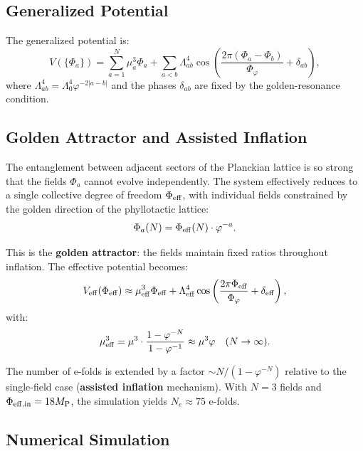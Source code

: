 \documentclass[11pt,a4paper]{article}
\theoremstyle{definition}
\begin{document}
\subsection{Generalized Potential}

The generalized potential is:
\begin{equation}
V(\{\Phi_a\}) = \sum_{a=1}^N \mu_a^3 \Phi_a + \sum_{a < b} \Lambda_{ab}^4 \cos\left( \frac{2\pi(\Phi_a - \Phi_b)}{\Phi_\varphi} + \delta_{ab} \right),
\end{equation}
where $\Lambda_{ab}^4 = \Lambda_0^4 \varphi^{-2|a-b|}$ and the phases $\delta_{ab}$ are fixed by the golden-resonance condition.

\subsection{Golden Attractor and Assisted Inflation}

The entanglement between adjacent sectors of the Planckian lattice is so strong that the fields $\Phi_a$ cannot evolve independently. The system effectively reduces to a single collective degree of freedom $\Phi_{\rm eff}$, with individual fields constrained by the golden direction of the phyllotactic lattice:
\begin{equation}\label{eq:attractor}
\Phi_a(N) = \Phi_{\rm eff}(N) \cdot \varphi^{-a}.
\end{equation}

This is the \textbf{golden attractor}: the fields maintain fixed ratios throughout inflation. The effective potential becomes:
\begin{equation}
V_{\rm eff}(\Phi_{\rm eff}) \approx \mu_{\rm eff}^3 \Phi_{\rm eff} + \Lambda_{\rm eff}^4 \cos\left( \frac{2\pi \Phi_{\rm eff}}{\Phi_\varphi} + \delta_{\rm eff} \right),
\end{equation}
with:
\begin{equation}
\mu_{\rm eff}^3 = \mu^3 \cdot \frac{1 - \varphi^{-N}}{1 - \varphi^{-1}} \approx \mu^3 \varphi \quad (N \to \infty).
\end{equation}

The number of e-folds is extended by a factor $\sim N/(1 - \varphi^{-N})$ relative to the single-field case (\textbf{assisted inflation} mechanism). With $N = 3$ fields and $\Phi_{\rm eff, in} = 18 M_{\rm P}$, the simulation yields $N_e \approx 75$ e-folds.

\subsection{Numerical Simulation}
\end{document}
